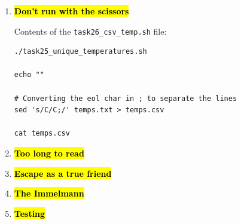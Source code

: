 \documentclass[9pt]{article}
\begin{document}
\begin{enumerate}
    \item \hl{\textbf{Don't run with the scissors}}

        Contents of the \texttt{task26\_csv\_temp.sh} file:
        \begin{lstlisting}
./task25_unique_temperatures.sh

echo ""

# Converting the eol char in ; to separate the lines
sed 's/C/C;/' temps.txt > temps.csv

cat temps.csv
        \end{lstlisting}

    \item \hl{\textbf{Too long to read}}
    \item \hl{\textbf{Escape as a true friend}}
    \item \hl{\textbf{The Immelmann}}
    \item \hl{\textbf{Testing}}

\end{enumerate}
\end{document}
